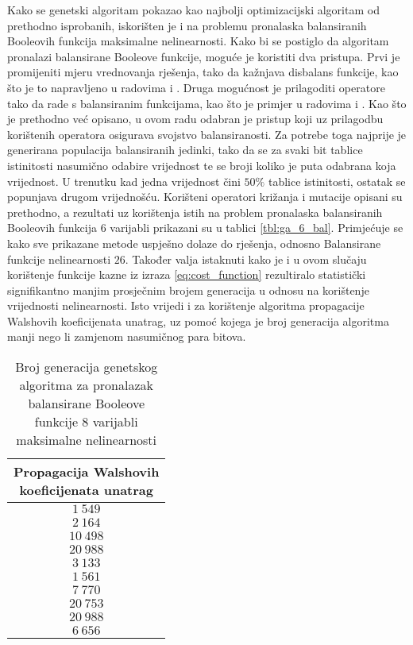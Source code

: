Kako se genetski algoritam pokazao kao najbolji optimizacijski algoritam od prethodno isprobanih, iskorišten je i na problemu pronalaska balansiranih Booleovih funkcija maksimalne nelinearnosti. 
Kako bi se postiglo da algoritam pronalazi balansirane Booleove funkcije, moguće je koristiti dva pristupa.
Prvi je promijeniti mjeru vrednovanja rješenja, tako da kažnjava disbalans funkcije, kao što je to napravljeno u radovima \cite{MaximalNonlinearity} i \cite{CryptographicBoolean}.
Druga mogućnost je prilagoditi operatore tako da rade s balansiranim funkcijama, kao što je primjer u radovima \cite{millan1997effective} i \cite{manzoni2019balanced}.
Kao što je prethodno već opisano, u ovom radu odabran je pristup koji uz prilagodbu korištenih operatora osigurava svojstvo balansiranosti.
Za potrebe toga najprije je generirana populacija balansiranih jedinki, tako da se za svaki bit tablice istinitosti nasumično odabire vrijednost te se broji koliko je puta odabrana koja vrijednost.
U trenutku kad jedna vrijednost čini $50\%$ tablice istinitosti, ostatak se popunjava drugom vrijednošću.
Korišteni operatori križanja i mutacije opisani su prethodno, a rezultati uz korištenja istih na problem pronalaska balansiranih Booleovih funkcija $6$ varijabli prikazani su u tablici \ref{tbl:ga_6_bal}.
Primjećuje se kako sve prikazane metode uspješno dolaze do rješenja, odnosno Balansirane funkcije nelinearnosti $26$.
Također valja istaknuti kako je i u ovom slučaju korištenje funkcije kazne iz izraza \eqref{eq:cost_function} rezultiralo statistički signifikantno manjim prosječnim brojem generacija u odnosu na korištenje vrijednosti nelinearnosti.
Isto vrijedi i za korištenje algoritma propagacije Walshovih koeficijenata unatrag, uz pomoć kojega je broj generacija algoritma manji nego li zamjenom nasumičnog para bitova.

\begin{table}[]
    \centering
    \begin{tabular}{c}
        \makecell{Propagacija Walshovih \\ koeficijenata unatrag} \\ \hline
         $1\:549$ \\
         $2\:164$ \\
        $10\:498$ \\
        $20\:988$ \\
         $3\:133$ \\
         $1\:561$ \\
         $7\:770$ \\
        $20\:753$ \\
        $20\:988$ \\
         $6\:656$ 
    \end{tabular}
    \captionsetup{justification=centering}
    \caption{Broj generacija genetskog algoritma za pronalazak balansirane Booleove funkcije $8$ varijabli maksimalne nelinearnosti}
    \label{tbl:ga_8_bal}
\end{table}

